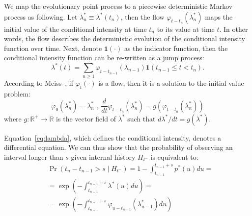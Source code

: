 \documentclass{juliacon}
\numberwithin{equation}{section}
\begin{document}
We map the evolutionary point process to a piecewise deterministic Markov process as following. Let \( \lambda^\ast_n \equiv \lambda^\ast(t_n) \), then the flow \( \varphi_{t-t_n}( \lambda^\ast_n ) \) maps the initial value of the conditional intensity at time \( t_n \) to its value at time \( t \). In other words, the flow describes the deterministic evolution of the conditional intensity function over time. Next, denote \( \mathbf{1}( \cdot ) \) as the indicator function, then the conditional intensity function can be re-written as a jump process:
\begin{equation} \label{eqn:conditional-jump}
  \lambda^\ast (t) = \sum_{n \geq 1} \varphi_{t - t_{n-1}} ( \lambda_{n-1} ) \mathbf{1}(t_{n-1} \leq t < t_n).
\end{equation}
According to Meiss~\cite{meiss2017}, if \( \varphi_t ( \cdot ) \) is a flow, then it is a solution to the initial value problem:
\begin{equation}
  \varphi_{0} (\lambda_n^\ast) = \lambda_n^\ast \text{ , }
  \frac{d}{dt} \varphi_{t-t_n} (\lambda_n^\ast) = g(\varphi_{t-t_n} (\lambda_n^\ast))
\end{equation}
where \( g: \mathbb{R}^+ \to \mathbb{R} \) is the vector field of \( \lambda^\ast \) such that \( d \lambda^\ast / dt = g( \lambda^\ast ) \).

Equation~\ref{eq:lambda}, which defines the conditional intensity, denotes a differential equation. We can thus show that the probability of observing an interval longer than \( s \) given internal history \( H_{t^-} \) is equivalent to:
\begin{equation} \label{eqn:transition-rate}
\begin{split}
  &\Pr(t_n - t_{n-1} > s \mid H_{t^-}) = 1 - \int_{t_{n-1}}^{t_{n-1} + s} p^\ast(u) du = \\
    &=\exp \left( -\int_{t_{n-1}}^{t_{n-1} + s} \lambda^\ast (u) du \right) = \\
    &=\exp \left( -\int_{t_{n-1}}^{t_{n-1} + s} \varphi_{u-t_{n-1}} (\lambda_{n-1}^\ast) du \right)
\end{split}
\end{equation}
\end{document}
